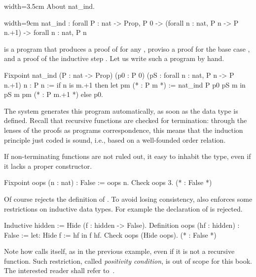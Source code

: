 \begin{coq}{}{width=3.5cm}
About nat_ind.
\end{coq}
\begin{coqout}{}{width=9cm}
nat_ind : forall P : nat -> Prop,
  P 0 -> (forall n : nat, P n -> P n.+1) -> forall n : nat, P n
\end{coqout}
 is a program that produces a proof of  for any ,
proviso a proof for the base case , and a proof
of the inductive step .
Let us write such a program by hand.

\begin{coq}{}{}
Fixpoint nat_ind (P : nat -> Prop)
  (p0 : P 0) (pS : forall n : nat, P n -> P n.+1) n : P n :=
  if n is m.+1 then
    let pm (* : P m *) := nat_ind P p0 pS m in
    pS m pm (* : P m.+1 *)
  else p0.
\end{coq}

The \Coq{} system generates this program automatically, as soon as
 the  data type
is defined.  Recall that recursive functions are checked for termination:
through the lenses of the proofs as programs correspondence, this means
that the induction principle just coded is sound, i.e., based on a
well-founded order relation.

If non-terminating functions are not ruled out, it easy to inhabit
the  type, even if it lacks a proper constructor.

\begin{coq}{}{}
Fixpoint oops (n : nat) : False := oops n.
Check oops 3.  (* : False *)
\end{coq}
Of course \Coq{} rejects the definition of .  To avoid
losing consistency, \Coq{} also enforces some restrictions on
inductive data types.  For example the declaration of 
is rejected.

\begin{coq}{}{}
Inductive hidden := Hide (f : hidden -> False).
Definition oops (hf : hidden) : False := let: Hide f := hf in f hf.
Check oops (Hide oops).  (* : False *)
\end{coq}
Note how  calls itself, as in the previous example,
even if it is not a recursive function.
Such restriction, called
\emph{positivity condition}, is out of scope for this book.
The interested reader shall
refer to~\cite{Coq:manual}.

\label{sec:strongind}

